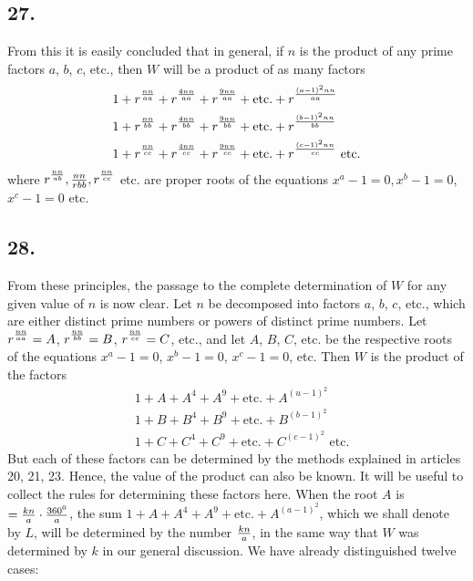 \documentclass[twoside,12pt]{memoir}
\let\oldfrac\frac
\def\frac#1#2{\mathchoice{\tfrac{#1}{#2}}{\oldfrac{#1}{#2}}{\genfrac{}{}{}{2}{#1}{#2\mathstrut}}{\genfrac{}{}{}{3}{#1}{#2\mathstrut}}}
\begin{document}
\subsection*{27.}

From this it is easily concluded that in general, if \(n\) is the product of any prime factors \(a\), \(b\), \(c\), etc{.}, then \(W\) will be a product of as many factors
\[\begin{aligned}
& 1+r^{\frac{n n}{a a}}+r^{\frac{4 n n}{a a}}+r^{\frac{9 n n}{a a}}+\text{etc{.}}+r^{\frac{(a-1)^{2} n n}{a a}} \\
& 1+r^{\frac{n n}{b b}}+r^{\frac{4 n n}{b b}}+r^{\frac{9 n n}{b b}}+\text{etc{.}}+r^{\frac{(b-1)^{2} n n}{b b}} \\
& 1+r^{\frac{n n}{c c}}+r^{\frac{4 n n}{c c}}+r^{\frac{9 n n}{c c}}+\text{etc{.}}+r^{\frac{(c-1)^{2} n n}{c c}} \text{ etc{.}}
\end{aligned}\]
where \(r^{\frac{n n}{a b}}, \frac{n n}{r b b}, r^{\frac{n n}{c c}}\) etc{.} are proper roots of the equations \(x^{a}-1=0, x^{b}-1=0\), \(x^{c}-1=0\) etc{.}
%

\subsection*{28.}
 
From these principles, the passage to the complete determination of \(W\) for any given value of \(n\) is now clear. Let \(n\) be decomposed into factors \(a\), \(b\), \(c\), etc{.}, which are either distinct prime numbers or powers of distinct prime numbers. Let \(r^{\frac{n n}{a a}}=A\), \(r^{\frac{n n}{b b}}=B\), \(r^{\frac{n n}{c c}}=C\), etc{.}, and let \(A\), \(B\), \(C\), etc{.} be the respective roots of the equations \(x^{a}-1=0\), \(x^{b}-1=0\), \(x^{c}-1=0\), etc{.} Then \(W\) is the product of the factors
\[\begin{aligned}
& 1+A+A^{4}+A^{9}+\text{etc{.}}+A^{(u-1)^{2}} \\
& 1+B+B^{4}+B^{9}+\text{etc{.}}+B^{(b-1)^{2}} \\
& 1+C+C^{4}+C^{9}+\text{etc{.}}+C^{(c-1)^{2}} \text{ etc{.}}
\end{aligned}\]
But each of these factors can be determined by the methods explained in articles 20, 21, 23. Hence, the value of the product can also be known. It will be useful to collect the rules for determining these factors here.  When the root \(A\) is \(=\frac{k n}{a} \cdot \frac{360^{0}}{a}\), the sum \(1+A+A^{4}+A^{9}+\text{etc{.}}+A^{(a-1)^{2}}\), which we shall denote by \(L\), will be determined by the number \(\frac{k n}{a}\), in the same way that \(W\) was determined by \(k\) in our general discussion. We have already distinguished twelve cases:
\end{document}
